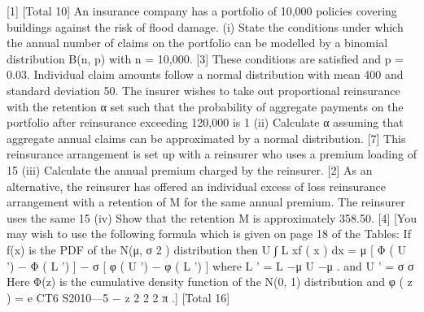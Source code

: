 \documentclass[a4paper,12pt]{article}
\begin{document}
 [1]
[Total 10]
An insurance company has a portfolio of 10,000 policies covering buildings against the risk of flood damage.
(i)
State the conditions under which the annual number of claims on the portfolio can be modelled by a binomial distribution B(n, p) with n = 10,000.
[3]
These conditions are satisfied and p = 0.03. Individual claim amounts follow a normal distribution with mean 400 and standard deviation 50. The insurer wishes to take out proportional reinsurance with the retention α set such that the probability of
aggregate payments on the portfolio after reinsurance exceeding 120,000 is 1%
(ii)
Calculate α assuming that aggregate annual claims can be approximated by a
normal distribution.
[7]
This reinsurance arrangement is set up with a reinsurer who uses a premium loading
of 15%
(iii)
Calculate the annual premium charged by the reinsurer.
[2]
As an alternative, the reinsurer has offered an individual excess of loss reinsurance
arrangement with a retention of M for the same annual premium. The reinsurer uses
the same 15%
(iv)
Show that the retention M is approximately 358.50.
[4]
[You may wish to use the following formula which is given on page 18 of the Tables:
If f(x) is the PDF of the N(μ, σ 2 ) distribution then
U
∫ L
xf ( x ) dx = μ [ Φ ( U ') − Φ ( L ') ] − σ [ φ ( U ') − φ ( L ') ]
where L ' =
L −μ
U −μ
.
and U ' =
σ
σ
Here Φ(z) is the cumulative density function of the N(0, 1) distribution and
φ ( z ) =
e
CT6 S2010—5
−
z 2
2
2 π
.]
[Total 16]
\end{document}
